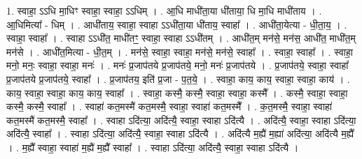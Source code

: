 \documentclass[17pt]{extarticle}
\begin{document}
1. स्वाहा॒ ऽऽधि मा॒धिꣳ स्वाहा॒ स्वाहा॒ ऽऽधिम् । . आ॒धि माधी॑ता॒या धी॑ताया॒ धि मा॒धि माधी॑ताय । . आ॒धिमित्या᳚ - धिम् । . आधी॑ताय॒ स्वाहा॒ स्वाहा ऽऽधी॑ता॒या धी॑ताय॒ स्वाहा᳚ । . आधी॑ता॒येत्या - धी॒ता॒य॒ । . स्वाहा॒ स्वाहा᳚ । . स्वाहा ऽऽधी॑त॒ माधी॑तꣳ॒॒ स्वाहा॒ स्वाहा ऽऽधी॑तम् । . आधी॑त॒म् मन॑से॒ मन॑स॒ आधी॑त॒ माधी॑त॒म् मन॑से । . आधी॑त॒मित्या - धी॒त॒म् । . मन॑से॒ स्वाहा॒ स्वाहा॒ मन॑से॒ मन॑से॒ स्वाहा᳚ । . स्वाहा॒ स्वाहा᳚ । . स्वाहा॒ मनो॒ मनः॒ स्वाहा॒ स्वाहा॒ मनः॑ । . मनः॑ प्र॒जाप॑तये प्र॒जाप॑तये॒ मनो॒ मनः॑ प्र॒जाप॑तये । . प्र॒जाप॑तये॒ स्वाहा॒ स्वाहा᳚ प्र॒जाप॑तये प्र॒जाप॑तये॒ स्वाहा᳚ । . प्र॒जाप॑तय॒ इति॑ प्र॒जा - प॒त॒ये॒ । . स्वाहा॒ काय॒ काय॒ स्वाहा॒ स्वाहा॒ काय॑ । . काय॒ स्वाहा॒ स्वाहा॒ काय॒ काय॒ स्वाहा᳚ । . स्वाहा॒ कस्मै॒ कस्मै॒ स्वाहा॒ स्वाहा॒ कस्मै᳚ । . कस्मै॒ स्वाहा॒ स्वाहा॒ कस्मै॒ कस्मै॒ स्वाहा᳚ । . स्वाहा॑ कत॒मस्मै॑ कत॒मस्मै॒ स्वाहा॒ स्वाहा॑ कत॒मस्मै᳚ । . क॒त॒मस्मै॒ स्वाहा॒ स्वाहा॑ कत॒मस्मै॑ कत॒मस्मै॒ स्वाहा᳚ । . स्वाहा ऽदि॑त्या॒ अदि॑त्यै॒ स्वाहा॒ स्वाहा ऽदि॑त्यै । . अदि॑त्यै॒ स्वाहा॒ स्वाहा ऽदि॑त्या॒ अदि॑त्यै॒ स्वाहा᳚ । . स्वाहा ऽदि॑त्या॒ अदि॑त्यै॒ स्वाहा॒ स्वाहा ऽदि॑त्यै । . अदि॑त्यै म॒ह्यै॑ म॒ह्या॑ अदि॑त्या॒ अदि॑त्यै म॒ह्यै᳚ । . म॒ह्यै᳚ स्वाहा॒ स्वाहा॑ म॒ह्यै॑ म॒ह्यै᳚ स्वाहा᳚ । . स्वाहा ऽदि॑त्या॒ अदि॑त्यै॒ स्वाहा॒ स्वाहा ऽदि॑त्यै । \newline
\end{document}
